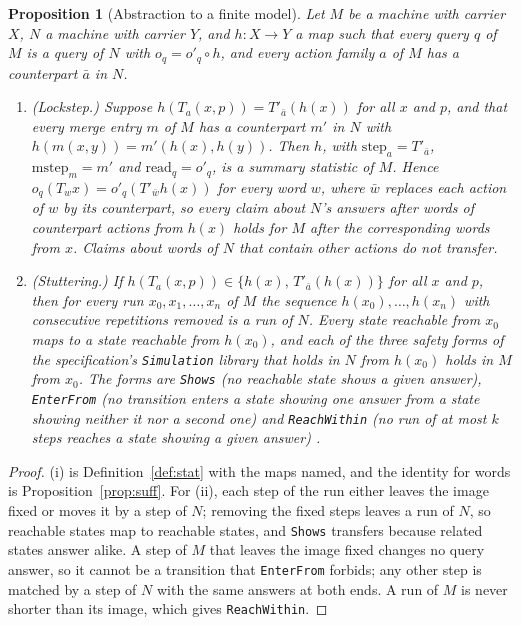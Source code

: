 \documentclass[11pt]{article}
\newcommand{\code}[1]{\texttt{#1}}
\newcommand{\step}{\mathrm{step}}
\newcommand{\rd}{\mathrm{read}}
\newcommand{\mstep}{\mathrm{mstep}}
\theoremstyle{definition}
\theoremstyle{plain}
\newtheorem{proposition}[definition]{Proposition}
\begin{document}
\begin{proposition}[Abstraction to a finite model]\label{prop:stutter}
Let $M$ be a machine with carrier $X$, $N$ a machine with carrier $Y$, and $h\colon X\to Y$ a map
such that every query $q$ of $M$ is a query of $N$ with $o_q=o'_q\circ h$, and every action family
$a$ of $M$ has a counterpart $\bar a$ in $N$.
\begin{enumerate}[label=(\roman*)]
\item (Lockstep.) Suppose $h(T_a(x,p))=T'_{\bar a}(h(x))$ for all $x$ and $p$, and that every
  merge entry $m$ of $M$ has a counterpart $m'$ in $N$ with $h(m(x,y))=m'(h(x),h(y))$. Then $h$, with
  $\step_a=T'_{\bar a}$, $\mstep_m=m'$ and $\rd_q=o'_q$, is a summary statistic of $M$. Hence
  $o_q(T_wx)=o'_q(T'_{\bar w}h(x))$ for every word $w$, where $\bar w$ replaces each action of $w$ by
  its counterpart, so every claim about $N$'s answers after words of counterpart actions from
  $h(x)$ holds for $M$ after the corresponding words from $x$. Claims about words of $N$ that
  contain other actions do not transfer.
\item (Stuttering.) If $h(T_a(x,p))\in\{h(x),\,T'_{\bar a}(h(x))\}$ for all $x$ and $p$, then for
  every run $x_0,x_1,\ldots,x_n$ of $M$ the sequence $h(x_0),\ldots,h(x_n)$ with consecutive
  repetitions removed is a run of $N$. Every state reachable from $x_0$ maps to a state reachable from
  $h(x_0)$, and each of the three safety forms of the specification's \code{Simulation} library that
  holds in $N$ from $h(x_0)$ holds in $M$ from $x_0$. The forms are \code{Shows} (no reachable state
  shows a given answer), \code{EnterFrom} (no transition enters a state showing one answer from a
  state showing neither it nor a second one) and \code{ReachWithin} (no run of at most $k$ steps
  reaches a state showing a given answer) \cite[Section~8.2]{spec}.
\end{enumerate}
\end{proposition}

\begin{proof}
(i) is Definition~\ref{def:stat} with the maps named, and the identity for words is
Proposition~\ref{prop:suff}. For (ii), each step of the run either leaves
the image fixed or moves it by a step of $N$; removing the fixed steps leaves a run of $N$, so
reachable states map to reachable states, and \code{Shows} transfers because related states answer
alike. A step of $M$ that leaves the image fixed changes no query answer, so it cannot be a
transition that \code{EnterFrom} forbids; any other step is matched by a step of $N$ with the same
answers at both ends. A run of $M$ is never shorter than its image, which gives
\code{ReachWithin}.
\end{proof}
\end{document}
